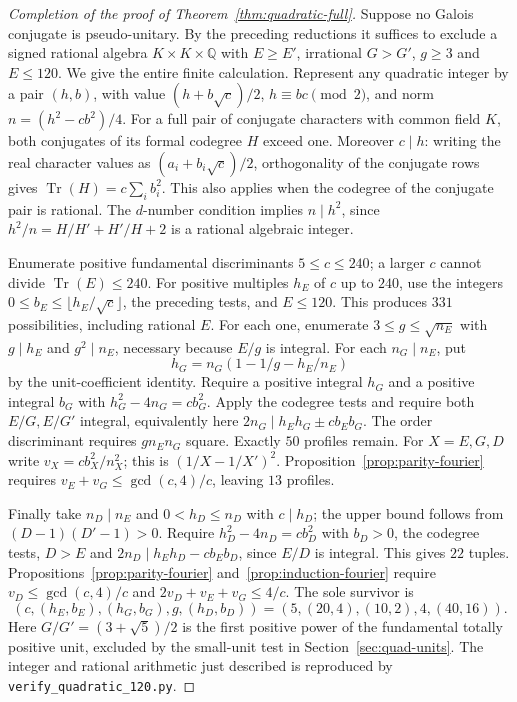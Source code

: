 \documentclass[11pt,a4paper]{article}
\numberwithin{equation}{section}
\begin{document}
\begin{proof}[Completion of the proof of Theorem~\ref{thm:quadratic-full}]

Suppose no Galois conjugate is pseudo-unitary. By the preceding reductions it
suffices to exclude a signed rational algebra $K\times K\times\mathbb Q$
with $E\ge E'$, irrational $G>G'$, $g\ge3$ and $E\le120$.
We give the entire finite calculation.
Represent any quadratic integer by a pair $(h,b)$, with value
$(h+b\sqrt c)/2$, $h\equiv bc\pmod2$, and norm
$n=(h^2-cb^2)/4$. For a full pair of conjugate characters with common
field $K$, both conjugates of its formal codegree $H$ exceed one.
Moreover $c\mid h$: writing the real character values as
$(a_i+b_i\sqrt c)/2$, orthogonality of the conjugate rows gives
$\operatorname{Tr}(H)=c\sum_i b_i^2$. This also applies when the
codegree of the conjugate pair is rational. The $d$-number condition
implies $n\mid h^2$, since $h^2/n=H/H'+H'/H+2$ is a rational
algebraic integer.

Enumerate positive fundamental discriminants $5\le c\le240$; a larger
$c$ cannot divide $\operatorname{Tr}(E)\le240$. For positive multiples
$h_E$ of $c$ up to $240$, use the integers
$0\le b_E\le\lfloor h_E/\sqrt c\rfloor$, the preceding tests, and
$E\le120$. This produces $331$ possibilities, including rational $E$.
For each one, enumerate $3\le g\le\sqrt{n_E}$ with $g\mid h_E$ and
$g^2\mid n_E$, necessary because $E/g$ is integral.
For each $n_G\mid n_E$, put
\[
 h_G=n_G(1-1/g-h_E/n_E)
\]
by the unit-coefficient identity. Require a positive integral $h_G$
and a positive integral $b_G$ with $h_G^2-4n_G=c b_G^2$. Apply the
codegree tests and require both $E/G,E/G'$ integral, equivalently
here $2n_G\mid h_E h_G\pm c b_E b_G$. The order discriminant requires
$g n_E n_G$ square. Exactly $50$ profiles remain.
For $X=E,G,D$ write $v_X=c b_X^2/n_X^2$; this is
$(1/X-1/X')^2$. Proposition~\ref{prop:parity-fourier} requires
$v_E+v_G\le\gcd(c,4)/c$, leaving $13$ profiles.

Finally take $n_D\mid n_E$ and $0<h_D\le n_D$ with $c\mid h_D$;
the upper bound follows from $(D-1)(D'-1)>0$. Require
$h_D^2-4n_D=c b_D^2$ with $b_D>0$, the codegree tests, $D>E$ and
$2n_D\mid h_Eh_D-cb_Eb_D$, since $E/D$ is integral.
This gives $22$ tuples. Propositions~\ref{prop:parity-fourier}
and~\ref{prop:induction-fourier} require
$v_D\le\gcd(c,4)/c$ and $2v_D+v_E+v_G\le4/c$. The sole survivor is
\[
 (c,(h_E,b_E),(h_G,b_G),g,(h_D,b_D))
     =(5,(20,4),(10,2),4,(40,16)).
\]
Here $G/G'=(3+\sqrt5)/2$ is the first positive power of the
fundamental totally positive unit, excluded by the small-unit test in
Section~\ref{sec:quad-units}.
The integer and rational arithmetic just described is reproduced by
\texttt{verify\_quadratic\_120.py}.
\end{proof}
\end{document}
